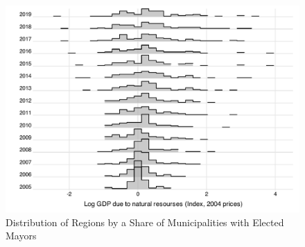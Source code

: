 \documentclass[12pt]{article}
\numberwithin{equation}{section}
\numberwithin{table}{section}
\numberwithin{figure}{section}
\begin{document}
\begin{figure}\centering
    \caption{Distribution of Regions by a Share of Municipalities with Elected Mayors}
    \includegraphics[width=\textwidth]{Figures/ridgeplot_resourse_extraction_gdp.pdf}
\end{figure}
\end{document}
